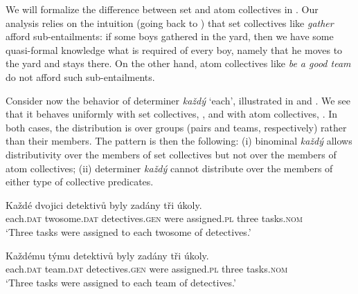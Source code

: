 \documentclass[output=paper,colorlinks,citecolor=brown,newtxmath]{langscibook}
\begin{document}
\z

\label{ex:line284}
\z

\noindent We will formalize the difference between set and atom collectives in . Our analysis relies on the intuition (going back to \citealt{Dowty1987}) that set collectives like \textit{gather} afford sub-entailments: if some boys gathered in the yard, then we have some quasi-formal knowledge what is required of every boy, namely that he moves to the yard and stays there. On the other hand, atom collectives like \textit{be a good team} do not afford such sub-entailments.

Consider now the behavior of determiner \textit{každý} `each', illustrated in  and . We see that it behaves uniformly with set collectives, , and with atom collectives, . In both cases, the distribution is over groups (pairs and teams, respectively) rather than their members. The pattern is then the following: (i) binominal \textit{každý} allows distributivity over the members of set collectives but not over the members of atom collectives; (ii) determiner \textit{každý} cannot distribute over the members of either type of collective predicates.

\ea\label{ex:line298}\gll Každé dvojici detektivů byly zadány tři
úkoly.\\
each.\textsc{dat} twosome.\textsc{dat} detectives.\textsc{gen} were assigned.\textsc{pl} three
tasks.\textsc{nom}\\
\glt `Three tasks were assigned to each twosome of detectives.'
\z

\ea\label{ex:line305}\gll Každému týmu detektivů byly zadány tři
úkoly.\\
each.\textsc{dat} team.\textsc{dat} detectives.\textsc{gen} were assigned.\textsc{pl} three tasks.\textsc{nom}\\
\glt `Three tasks were assigned to each team of detectives.'
\z
\end{document}
